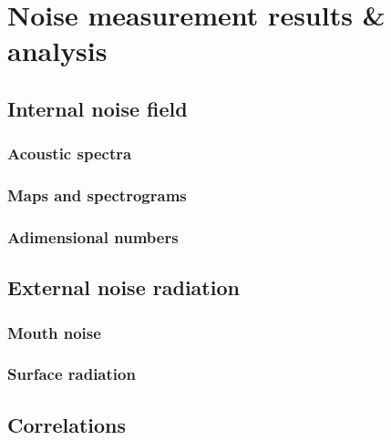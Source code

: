 
\chapter{Noise measurement results \& analysis} \label{cap:results}

\noindent 

\section{Internal noise field}
\subsection{Acoustic spectra} 
\subsection{Maps and spectrograms}
\subsection{Adimensional numbers}

\section{External noise radiation}
\label{sec:external_results}
\subsection{Mouth noise} 
\subsection{Surface radiation}

\section{Correlations}
\label{sec:correlations}
